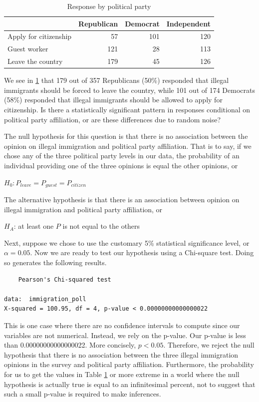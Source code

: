 \documentclass[
]{book}
\begin{document}
\begin{table}

\caption{\label{tab:pollparty}Response by political party}
\centering
\begin{tabular}[t]{l|r|r|r}
\hline
  & Republican & Democrat & Independent\\
\hline
Apply for citizenship & 57 & 101 & 120\\
\hline
Guest worker & 121 & 28 & 113\\
\hline
Leave the country & 179 & 45 & 126\\
\hline
\end{tabular}
\end{table}

We see in \ref{tab:pollparty} that 179 out of 357 Republicans (50\%) responded that illegal immigrants should be forced to leave the country, while 101 out of 174 Democrats (58\%) responded that illegal immigrants should be allowed to apply for citizenship. Is there a statistically significant pattern in responses conditional on political party affiliation, or are these differences due to random noise?

The null hypothesis for this question is that there is no association between the opinion on illegal immigration and political party affiliation. That is to say, if we chose any of the three political party levels in our data, the probability of an individual providing one of the three opinions is equal the other opinions, or

\(H_0: P_{leave} = P_{guest} = P_{citizen}\)

The alternative hypothesis is that there is an association between opinion on illegal immigration and political party affiliation, or

\(H_A\): at least one \(P\) is not equal to the others

Next, suppose we chose to use the customary 5\% statistical significance level, or \(\alpha=0.05\). Now we are ready to test our hypothesis using a Chi-square test. Doing so generates the following results.

\begin{verbatim}
	Pearson's Chi-squared test

data:  immigration_poll
X-squared = 100.95, df = 4, p-value < 0.00000000000000022
\end{verbatim}

This is one case where there are no confidence intervals to compute since our variables are not numerical. Instead, we rely on the p-value. Our p-value is less than 0.00000000000000022. More concisely, \(p<0.05\). Therefore, we reject the null hypothesis that there is no association between the three illegal immigration opinions in the survey and political party affiliation. Furthermore, the probability for us to get the values in Table \ref{tab:pollparty} or more extreme in a world where the null hypothesis is actually true is equal to an infinitesimal percent, not to suggest that such a small p-value is required to make inferences.
\end{document}

